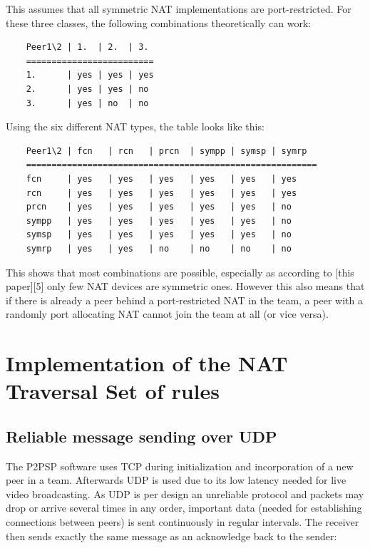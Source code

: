 \documentclass{article}
\begin{document}
This assumes that all symmetric NAT implementations are
port-restricted. For these three classes, the following combinations
theoretically can work:

\begin{verbatim}
    Peer1\2 | 1.  | 2.  | 3.
    =========================
    1.      | yes | yes | yes
    2.      | yes | yes | no
    3.      | yes | no  | no
\end{verbatim}

Using the six different NAT types, the table looks like this:

\begin{verbatim}
    Peer1\2 | fcn   | rcn   | prcn  | sympp | symsp | symrp
    =========================================================
    fcn     | yes   | yes   | yes   | yes   | yes   | yes
    rcn     | yes   | yes   | yes   | yes   | yes   | yes
    prcn    | yes   | yes   | yes   | yes   | yes   | no
    sympp   | yes   | yes   | yes   | yes   | yes   | no
    symsp   | yes   | yes   | yes   | yes   | yes   | no
    symrp   | yes   | yes   | no    | no    | no    | no
\end{verbatim}

This shows that most combinations are possible, especially as
according to [this paper][5] only few NAT devices are symmetric
ones. However this also means that if there is already a peer behind a
port-restricted NAT in the team, a peer with a randomly port
allocating NAT cannot join the team at all (or vice versa).

\section{Implementation of the NAT Traversal Set of rules}

\subsection{Reliable message sending over UDP}

The P2PSP software uses TCP during initialization and incorporation of
a new peer in a team. Afterwards UDP is used due to its low latency
needed for live video broadcasting. As UDP is per design an unreliable
protocol and packets may drop or arrive several times in any order,
important data (needed for establishing connections between peers) is
sent continuously in regular intervals. The receiver then sends
exactly the same message as an acknowledge back to the sender:
\end{document}
